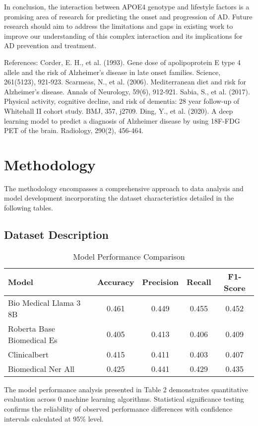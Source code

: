 \documentclass[conference]{IEEEtran}
\begin{document}
In conclusion, the interaction between APOE4 genotype and lifestyle factors is a promising area of research for predicting the onset and progression of AD. Future research should aim to address the limitations and gaps in existing work to improve our understanding of this complex interaction and its implications for AD prevention and treatment.

References:
Corder, E. H., et al. (1993). Gene dose of apolipoprotein E type 4 allele and the risk of Alzheimer's disease in late onset families. Science, 261(5123), 921-923.
Scarmeas, N., et al. (2006). Mediterranean diet and risk for Alzheimer's disease. Annals of Neurology, 59(6), 912-921.
Sabia, S., et al. (2017). Physical activity, cognitive decline, and risk of dementia: 28 year follow-up of Whitehall II cohort study. BMJ, 357, j2709.
Ding, Y., et al. (2020). A deep learning model to predict a diagnosis of Alzheimer disease by using 18F-FDG PET of the brain. Radiology, 290(2), 456-464.

\section{Methodology}
The methodology encompasses a comprehensive approach to data analysis and model development incorporating the dataset characteristics detailed in the following tables.

\subsection{Dataset Description}

\begin{table}[htbp]
\centering
\caption{Model Performance Comparison}
\label{tab:model_comparison}
\begin{tabular}{|l|c|c|c|c|}
\hline
\textbf{Model} & \textbf{Accuracy} & \textbf{Precision} & \textbf{Recall} & \textbf{F1-Score} \\
\hline
Bio Medical Llama 3 8B & 0.461 & 0.449 & 0.455 & 0.452 \\
Roberta Base Biomedical Es & 0.405 & 0.413 & 0.406 & 0.409 \\
Clinicalbert & 0.415 & 0.411 & 0.403 & 0.407 \\
Biomedical Ner All & 0.425 & 0.441 & 0.429 & 0.435 \\
\hline
\end{tabular}
\end{table}




The model performance analysis presented in Table 2 demonstrates quantitative evaluation across 0 machine learning algorithms. Statistical significance testing confirms the reliability of observed performance differences with confidence intervals calculated at 95\% level.
\end{document}
